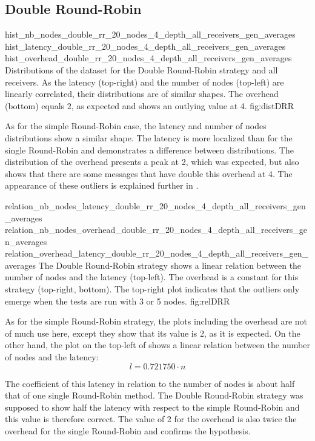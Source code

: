 \FloatBarrier
\subsection{Double Round-Robin}
\label{ssec:doubleRR}
\triplefigure
    {hist_nb_nodes_double_rr_20_nodes_4_depth_all_receivers_gen_averages}
    {hist_latency_double_rr_20_nodes_4_depth_all_receivers_gen_averages}
    {hist_overhead_double_rr_20_nodes_4_depth_all_receivers_gen_averages}
    {Distributions of the dataset for the Double Round-Robin strategy and all
    receivers. As the latency (top-right) and the number of nodes (top-left) are
    linearly correlated, their distributions are of similar shapes. The
    overhead (bottom) equals 2, as expected and shows an outlying value at 4.}
    {fig:distDRR}

As for the simple Round-Robin case, the latency and number of nodes
distributions show a similar shape. The latency is more localized than for the
single Round-Robin and demonstrates a difference between distributions. The
distribution of the overhead presents a peak at 2, which was expected, but also
shows that there are some messages that have double this overhead at 4. The
appearance of these outliers is explained further in .

\triplefigure
    {relation_nb_nodes_latency_double_rr_20_nodes_4_depth_all_receivers_gen_averages}
    {relation_nb_nodes_overhead_double_rr_20_nodes_4_depth_all_receivers_gen_averages}
    {relation_overhead_latency_double_rr_20_nodes_4_depth_all_receivers_gen_averages}
    {The Double Round-Robin strategy shows a linear relation between the number of
    nodes and the latency (top-left). The overhead is a constant for this
    strategy (top-right, bottom). The top-right plot indicates that the outliers
    only emerge when the tests are run with 3 or 5 nodes.}
    {fig:relDRR}

As for the simple Round-Robin strategy, the plots including the overhead are not
of much use here, except they show that its value is 2, as it is expected. 
On the other hand, the plot on the top-left of  shows a
linear relation between the number of nodes and the latency: 
\[l = 0.721750 \cdot n\]

The coefficient of this latency in relation to the number of nodes is about half
that of one single Round-Robin method. The Double Round-Robin strategy was
supposed to show half the latency with respect to the simple Round-Robin and
this value is therefore correct. The value of 2 for the overhead is also twice
the overhead for the single Round-Robin and confirms the hypothesis.
    

